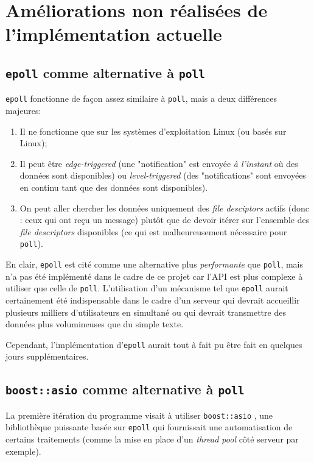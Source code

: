 \documentclass{article}
\begin{document}
\section{Améliorations non réalisées de l'implémentation actuelle}
\subsection{\texttt{epoll} comme alternative à \texttt{poll}}
\texttt{epoll} \cite{epoll} fonctionne de façon assez similaire à \texttt{poll}, mais a deux différences majeures:
\begin{enumerate}
    \item Il ne fonctionne que sur les systèmes d'exploitation Linux (ou basés sur Linux);
    \item Il peut être \textit{edge-triggered} (une "notification" est envoyée \textit{à l'instant} où des données sont disponibles) ou \textit{level-triggered} (des "notifications" sont envoyées en continu tant que des données sont disponibles). \cite{LevelEdgeTrigger}
    \item On peut aller chercher les données uniquement des \textit{file desciptors} actifs (donc : ceux qui ont reçu un message) plutôt que de devoir itérer sur l'ensemble des \textit{file descriptors} disponibles (ce qui est malheureusement nécessaire pour \texttt{poll}). \cite{EpollTrigger}
\end{enumerate}

\noindent En clair, \texttt{epoll} est cité comme une alternative plus \textit{performante} que \texttt{poll}, mais n'a pas été implémenté dans le cadre de ce projet car l'API est plus complexe à utiliser que celle de \texttt{poll}. L'utilisation d'un mécanisme tel que \texttt{epoll} aurait certainement été indispensable dans le cadre d'un serveur qui devrait accueillir plusieurs milliers d'utilisateurs en simultané ou qui devrait transmettre des données plus volumineuses que du simple texte.

Cependant, l'implémentation d'\texttt{epoll} aurait tout à fait pu être fait en quelques jours supplémentaires.

\subsection{\texttt{boost::asio} comme alternative à \texttt{poll}}
La première itération du programme visait à utiliser \texttt{boost::asio} \cite{boost}, une bibliothèque puissante basée sur \texttt{epoll} qui fournissait une automatisation de certains traitements (comme la mise en place d'un \textit{thread pool} côté serveur par exemple).
\end{document}
